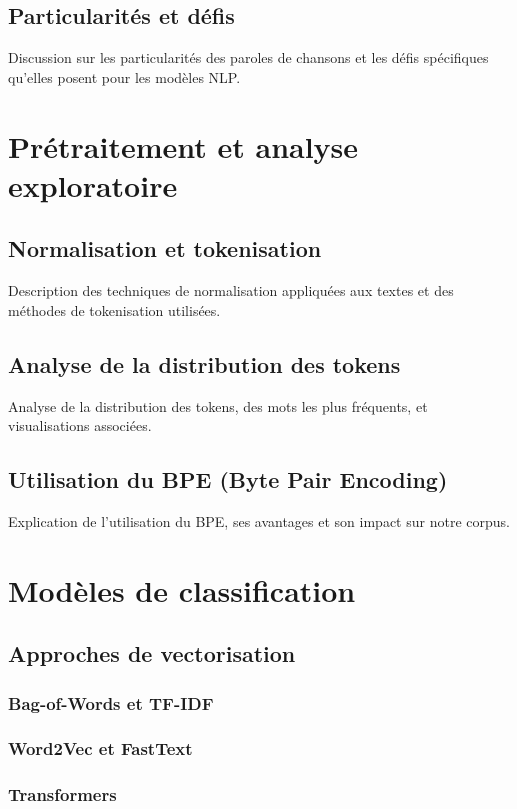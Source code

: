 \documentclass[a4paper,11pt]{article}
\begin{document}
\subsection{Particularités et défis}
Discussion sur les particularités des paroles de chansons et les défis spécifiques qu'elles posent pour les modèles NLP.

\section{Prétraitement et analyse exploratoire}
\label{sec:preprocessing}

\subsection{Normalisation et tokenisation}
Description des techniques de normalisation appliquées aux textes et des méthodes de tokenisation utilisées.

\subsection{Analyse de la distribution des tokens}
Analyse de la distribution des tokens, des mots les plus fréquents, et visualisations associées.

\subsection{Utilisation du BPE (Byte Pair Encoding)}
Explication de l'utilisation du BPE, ses avantages et son impact sur notre corpus.

\section{Modèles de classification}
\label{sec:classification}

\subsection{Approches de vectorisation}
\subsubsection{Bag-of-Words et TF-IDF}
\subsubsection{Word2Vec et FastText}
\subsubsection{Transformers}
\end{document}

